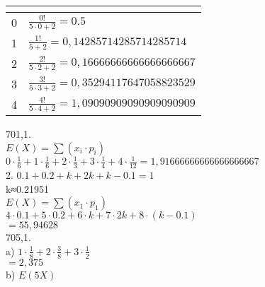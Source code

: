 \documentclass{article}
\begin{document}
  \begin{table}
    \caption{}\label{tab:}
    \begin{center}
      \begin{tabular}[c]{l|l}
        \hline
        \multicolumn{1}{c|}{\textbf{}} & 
        \multicolumn{1}{c}{\textbf{}} \\
        \hline
        0 & $\frac{0!}{5\cdot0+2}=0.5$ \\
        1 & $\frac{1!}{5+2}=0,14285714285714285714$ \\
        2 & $\frac{2!}{5\cdot2+2}=0,16666666666666666667$\\
        3 & $\frac{3!}{5\cdot3+2}=0,35294117647058823529$\\
        4 & $\frac{4!}{5\cdot4+2}=1,09090909090909090909$\\
        \hline
      \end{tabular}
    \end{center}
  \end{table}
  701,1. \\
  $E(X)=\sum (x_i\cdot p_i)$\\
  $0\cdot\frac{1}{6}+1\cdot\frac{1}{6}+2\cdot\frac{1}{3}+3\cdot\frac{1}{4}+4\cdot\frac{1}{12}=1,91666666666666666667$\\
  2. $0.1+0.2+k+2k+k-0.1=1$\\
  k≈0.21951\\
  $E(X)=\sum (x_1\cdot p_1)$\\
  $4\cdot0.1+5\cdot0.2+6\cdot k+ 7\cdot 2k+8\cdot (k-0.1)$\\
  $=55,94628$\\
  705,1.\\
  a) $1\cdot\frac{1}{8}+2\cdot\frac{3}{8}+3\cdot\frac{1}{2}$\\
  $=2,375$\\
  b) $E(5X)$\\

  

   
\end{document}
